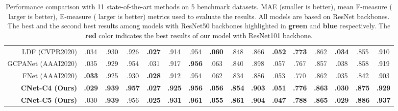 \documentclass[10pt,twocolumn,letterpaper]{article}
\begin{document}
\begin{table*}
\begin{center}
\begin{tabular}{|r|c|c|c|c|c|c|c|c|c|c|c|c|c|c|c|}
LDF (CVPR2020) & .034 & .930 & .926 & \textcolor{mgreen}{\textbf{.027}} & .914 & .954 & \textcolor{mblue}{\textbf{.060}} & .848 & .866 & \textcolor{mblue}{\textbf{.052}} & \textcolor{mblue}{\textbf{.773}} & .862 & \textcolor{mblue}{\textbf{.034}} & .855 & .910 \\

GCPANet (AAAI2020) & .035 & .929 & .954 & .031 & .917 & \textcolor{mblue}{\textbf{.956}} & .063 & .840 & .898 & .057 & .767 & .857 & .038 & .858 & .919 \\

FNet (AAAI2020) & \textcolor{mblue}{\textbf{.033}} & .925 & .930 & \textcolor{mblue}{\textbf{.028}} & .912 & .954 & .062 & .834 & .886 & .053 & .770 & .862 & .035 & .842 & .903 \\

\textbf{CNet-C4 (Ours)} & \textcolor{mgreen}{\textbf{.029}} & \textcolor{mgreen}{\textbf{.939}} & \textcolor{mgreen}{\textbf{.957}} & \textcolor{mgreen}{\textbf{.027}} & \textcolor{mgreen}{\textbf{.925}} & \textcolor{mblue}{\textbf{.956}} & \textcolor{mgreen}{\textbf{.056}} & \textcolor{mgreen}{\textbf{.854}} & \textcolor{mgreen}{\textbf{.903}} & \textcolor{mgreen}{\textbf{.051}} & \textcolor{mgreen}{\textbf{.776}} & 
\textcolor{mblue}{\textbf{.863}} & \textcolor{mgreen}{\textbf{.030}} & \textcolor{mgreen}{\textbf{.875}} & \textcolor{mgreen}{\textbf{.929}} \\

\hline\rule{0pt}{2.2ex}
\textbf{CNet-C5 (Ours)} & .030 & \textcolor{mred}{\textbf{.939}} & .956 & \textcolor{mred}{\textbf{.025}} & \textcolor{mred}{\textbf{.931}} & \textcolor{mred}{\textbf{.961}} & \textcolor{mred}{\textbf{.055}} & \textcolor{mred}{\textbf{.861}} & \textcolor{mred}{\textbf{.904}} & \textcolor{mred}{\textbf{.047}} & \textcolor{mred}{\textbf{.788}} & \textcolor{mred}{\textbf{.865}} & \textcolor{mred}{\textbf{.029}} & \textcolor{mred}{\textbf{.886}} & \textcolor{mred}{\textbf{.937}} \\

\hline
\end{tabular}
\end{center}
\caption{Performance comparison with 11 state-of-the-art methods on 5 benchmark datasets. MAE (smaller is better), mean F-measure ( larger is better), E-measure ( larger is better) metrics used to evaluate the results. All models are based on ResNet backbones. The best and the second best results among models with ResNet50 backbones highlighted in \textcolor{mgreen}{\textbf{green}} and \textcolor{mblue}{\textbf{blue}} respectively. The \textcolor{mred}{\textbf{red}} color indicates the best results of our model with ResNet101 backbone.}
\label{tab:comparison}
\end{table*}
\end{document}
